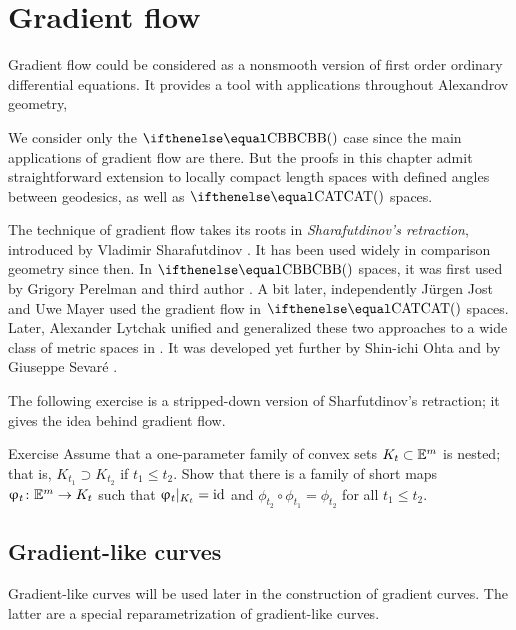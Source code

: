 \chapter{Gradient flow}\label{chap:grad}

Gradient flow could be considered as a nonsmooth version of first order ordinary differential equations.
It provides a tool with applications throughout Alexandrov geometry, 

We consider only the $\Alex{}{}$ case since the main applications of gradient flow are there.
But the proofs in this chapter admit straightforward extension to locally compact length spaces with defined angles between geodesics, as well as $\CAT{}{}$ spaces.

The technique of gradient flow takes its roots in \emph{Sharafutdinov's retraction}, 
introduced by Vladimir Sharafutdinov \cite{sharafutdinov}.
It has been used  widely in comparison geometry since then.
In $\Alex{}$ spaces, it was first used by Grigory Perelman and third author \cite{perelman-petrunin:qg}.
A bit later, independently J\"urgen Jost and Uwe Mayer \cite{jost,mayer} 
used the gradient flow in $\CAT{}$ spaces.
Later, Alexander Lytchak unified and generalized these two approaches
to a wide class of metric spaces in \cite{lytchak:open-map}.
It was developed  yet further by Shin-ichi Ohta \cite{ohta} and by Giuseppe Sevar\'e \cite{sevare}.

{\sloppy 
The following exercise is a stripped-down version of Sharfutdinov's retraction;
it gives the idea behind gradient flow.

}

\begin{thm}{Exercise}\label{ex:sharafutdinov}
Assume that a one-parameter family of convex sets $K_t\subset \EE^m$ is nested; 
that is, $K_{t_1}\supset K_{t_2}$ if $t_1\le t_2$.
Show that there is a family of short maps $\phi_t\:\EE^m\to K_t$ 
such that $\upvarphi_t|_{K_t}=\mathop{\rm id}\nolimits$ and $\phi_{t_2}\circ\phi_{t_1}=\phi_{t_2}$ for all $t_1\le t_2$.
\end{thm}




\section{Gradient-like curves}\label{sec:gradient-like}


Gradient-like curves will be used later in the construction of gradient curves.
The latter are a special reparametrization of gradient-like curves.

